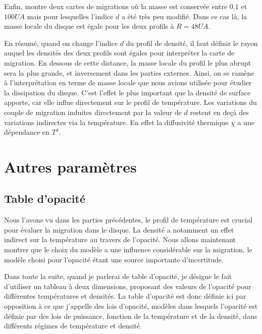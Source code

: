 Enfin,  montre deux cartes de migrations où la masse est conservée entre $0.1$ et $100\unit{UA}$ mais pour lesquelles l'indice $d$ a été très peu modifié. Dans ce cas là, la masse locale du disque est égale pour les deux profils à $R=48\unit{UA}$. 

\bigskip

En résumé, quand on change l'indice $d$ du profil de densité, il faut définir le rayon auquel les densités des deux profils sont égales pour interpréter la carte de migration. En dessous de cette distance, la masse locale du profil le plus abrupt sera la plus grande, et inversement dans les parties externes. Ainsi, on se ramène à l'interprétation en terme de masse locale que nous avions utilisée pour étudier la dissipation du disque. C'est l'effet le plus important que la densité de surface apporte, car elle influe directement sur le profil de température. Les variations du couple de migration induites directement par la valeur de $d$ restent en deçà des variations indirectes via la température. En effet la diffusivité thermique $\chi$ a une dépendance en $T^4$.

\section{Autres paramètres}



\subsection{Table d'opacité}\label{sec:influence_opacity_table}
Nous l'avons vu dans les parties précédentes, le profil de température est crucial pour évaluer la migration dans le disque. La densité a notamment un effet indirect sur la température au travers de l'opacité. Nous allons maintenant montrer que le choix du modèle a une influence considérable sur la migration, le modèle choisi pour l'opacité étant une source importante d'incertitude.

Dans toute la suite, quand je parlerai de table d'opacité, je désigne le fait d'utiliser un tableau à deux dimensions,
proposant des valeurs de l'opacité pour différentes températures et densités. La table d'opacité est donc définie ici par
opposition à ce que j'appelle des lois d'opacité, modèles dans lesquels l'opacité est définie par des lois de puissance,
fonction de la température et de la densité, dans différents régimes de température et densité.

